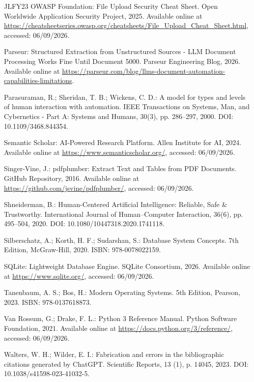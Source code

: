 \documentclass[12pt,a4paper,oneside]{report}
\begin{document}
\begin{thebibliography}{JLFY23}
OWASP Foundation: File Upload Security Cheat Sheet. Open Worldwide Application Security Project, 2025. Available online at \url{https://cheatsheetseries.owasp.org/cheatsheets/File_Upload_Cheat_Sheet.html}, accessed: 06/09/2026.

Parseur: Structured Extraction from Unstructured Sources - LLM Document Processing Works Fine Until Document 5000. Parseur Engineering Blog, 2026. Available online at \url{https://parseur.com/blog/llms-document-automation-capabilities-limitations}.

Parasuraman, R.; Sheridan, T. B.; Wickens, C. D.: A model for types and levels of human interaction with automation. IEEE Transactions on Systems, Man, and Cybernetics - Part A: Systems and Humans, 30(3), pp. 286--297, 2000. DOI: 10.1109/3468.844354.

Semantic Scholar: AI-Powered Research Platform. Allen Institute for AI, 2024. Available online at \url{https://www.semanticscholar.org/}, accessed: 06/09/2026.

Singer-Vine, J.: pdfplumber: Extract Text and Tables from PDF Documents. GitHub Repository, 2016. Available online at \url{https://github.com/jsvine/pdfplumber/}, accessed: 06/09/2026.

Shneiderman, B.: Human-Centered Artificial Intelligence: Reliable, Safe & Trustworthy. International Journal of Human–Computer Interaction, 36(6), pp. 495--504, 2020. DOI: 10.1080/10447318.2020.1741118.

Silberschatz, A.; Korth, H. F.; Sudarshan, S.: Database System Concepts. 7th Edition, McGraw-Hill, 2020. ISBN: 978-0078022159.

SQLite: Lightweight Database Engine. SQLite Consortium, 2026. Available online at \url{https://www.sqlite.org/}, accessed: 06/09/2026.

Tanenbaum, A. S.; Bos, H.: Modern Operating Systems. 5th Edition, Pearson, 2023. ISBN: 978-0137618873.

Van Rossum, G.; Drake, F. L.: Python 3 Reference Manual. Python Software Foundation, 2021. Available online at \url{https://docs.python.org/3/reference/}, accessed: 06/09/2026.

Walters, W. H.; Wilder, E. I.: Fabrication and errors in the bibliographic citations generated by ChatGPT. Scientific Reports, 13 (1), p. 14045, 2023. DOI: 10.1038/s41598-023-41032-5.






\end{thebibliography}
\end{document}
